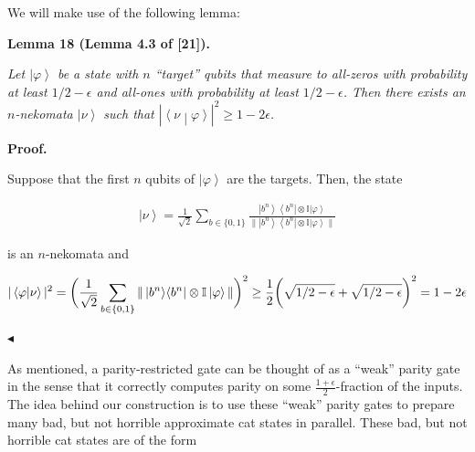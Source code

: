 We will make use of the following lemma:\par





\par\medskip\noindent\textbf{
\textbf{Lemma 18}\textbf{ }(Lemma 4.3 of [21])\textbf{.}
}\par



\emph{Let $\left|\varphi\right\rangle$ be a state with $n$ “target” qubits that measure to all-zeros with probability at least $1/2-\epsilon$ and all-ones with probability at least $1/2-\epsilon$. Then there exists an $n$-nekomata $\left|\nu\right\rangle$ such that $|\left\langle\nu\middle|\varphi\right\rangle|^{2}\geq 1-2\epsilon$.}\par






\par\medskip\noindent\textbf{Proof.}\par




Suppose that the first $n$ qubits of $\left|\varphi\right\rangle$ are the targets. Then, the state\par


\[\begin{gathered}
\left|\nu\right\rangle=\frac{1}{\sqrt{2}}\sum_{b\in\{0,1\}}\frac{\left|b^{n}\right\rangle\!\left\langle b^{n}\right|\otimes\mathbb{I}\left|\varphi\right\rangle}{\|\left|b^{n}\right\rangle\!\left\langle b^{n}\right|\otimes\mathbb{I}\left|\varphi\right\rangle\|}
\end{gathered}\]


is an $n$-nekomata and\par


\[\begin{gathered}
\displaystyle|\left\langle\varphi\middle|\nu\right\rangle|^{2}=\bigg{(}\frac{1}{\sqrt{2}}\sum_{b\in\{0,1\}}\|\left|b^{n}\right\rangle\!\left\langle b^{n}\right|\otimes\mathbb{I}\left|\varphi\right\rangle\|\bigg{)}^{2}\geq\frac{1}{2}\bigg{(}\sqrt{1/2-\epsilon}+\sqrt{1/2-\epsilon}\bigg{)}^{2}=1-2\epsilon
\end{gathered}\]


$\blacktriangleleft$\par




As mentioned, a parity-restricted gate can be thought of as a “weak” parity gate in the sense that it correctly computes parity on some $\frac{1+\epsilon}{2}$-fraction of the inputs. The idea behind our construction is to use these “weak” parity gates to prepare many bad, but not horrible approximate cat states in parallel. These bad, but not horrible cat states are of the form\par


